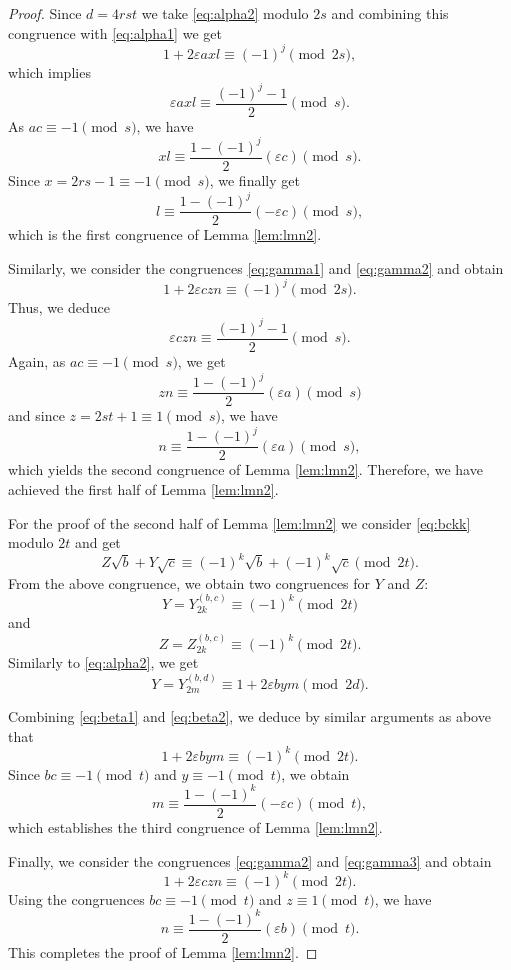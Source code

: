\documentclass{amsart}
\theoremstyle{definition}
\begin{document}
\begin{proof}
Since $d=4rst$ we take \eqref{eq:alpha2} modulo $2s$ and 
combining this congruence with \eqref{eq:alpha1} we get 
$$
1+2\varepsilon a  x l \equiv (-1)^j \pmod{2s},
$$
which implies 
$$
\varepsilon axl \equiv \frac{(-1)^j-1}{2} \pmod{s}.
$$
As $ac\equiv-1 \pmod{s}$, we have
$$
xl \equiv \frac{1-(-1)^j}{2}(\varepsilon c) \pmod{s}.
$$
Since $x=2rs-1\equiv -1 \pmod s$, we finally get 
$$
l \equiv \frac{1-(-1)^j}{2}(-\varepsilon c) \pmod{s},
$$
which is the first congruence of Lemma \ref{lem:lmn2}.

Similarly, we consider the congruences \eqref{eq:gamma1} and \eqref{eq:gamma2} and obtain 
$$
1+2\varepsilon czn \equiv (-1)^j \pmod{2s}.
$$
Thus, we deduce 
$$
\varepsilon czn \equiv \frac{(-1)^j-1}{2} \pmod{s}.
$$
Again, as $ac\equiv-1 \pmod{s}$, we get
$$
zn \equiv \frac{1-(-1)^j}{2}(\varepsilon a) \pmod{s}
$$
and since $z=2st+1\equiv 1 \pmod s$, we have 
$$
n \equiv \frac{1-(-1)^j}{2}(\varepsilon a) \pmod{s},
$$
which yields the second congruence of Lemma \ref{lem:lmn2}. Therefore, we have achieved the first half of Lemma \ref{lem:lmn2}. 

For the proof of the second half of Lemma \ref{lem:lmn2} we consider \eqref{eq:bckk} modulo $2t$ and get 
$$
Z\sqrt{b} + Y\sqrt{c}  \equiv (-1)^k\sqrt{b} + (-1)^k\sqrt{c} \pmod{2t}.
$$
From the above congruence, we obtain two congruences for $Y$ and $Z$:
\begin{equation}\label{eq:beta1}
Y = Y^{(b,c)}_{2k} \equiv (-1)^{k} \pmod{2t}
\end{equation}
and 
\begin{equation}\label{eq:gamma3}
Z= Z^{(b,c)}_{2k}\equiv (-1)^{k}\pmod {2t}. 
\end{equation}
Similarly to \eqref{eq:alpha2}, we get
\begin{equation}\label{eq:beta2}
Y = Y^{(b,d)}_{2m} \equiv  1+2\varepsilon b  y m \pmod{2d}.
\end{equation}

Combining \eqref{eq:beta1} and \eqref{eq:beta2}, we deduce by similar arguments as above that
$$
1+2\varepsilon bym \equiv (-1)^k \pmod{2t}.
$$
Since $bc\equiv -1 \pmod t$ and $y\equiv -1\pmod{t}$, we obtain
$$
m\equiv \frac{1-(-1)^k}{2}(-\varepsilon c) \pmod{t},
$$
which establishes the third congruence of Lemma \ref{lem:lmn2}.

Finally, we consider the congruences \eqref{eq:gamma2} and \eqref{eq:gamma3} and obtain
$$
1+2\varepsilon czn \equiv (-1)^k \pmod{2t}.
$$
Using the congruences $bc\equiv -1 \pmod{t}$ and $z\equiv 1\pmod{t}$, we have 
$$
n \equiv \frac{1-(-1)^k}{2}(\varepsilon b) \pmod{t}.
$$
This completes the proof of Lemma \ref{lem:lmn2}.
\end{proof}
\end{document}
